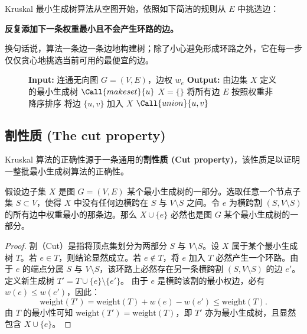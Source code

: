 Kruskal 最小生成树算法从空图开始，依照如下简洁的规则从 $E$ 中挑选边：
\begin{center}
    \textbf{反复添加下一条权重最小且不会产生环路的边。}
\end{center}

换句话说，算法一条边一条边地构建树；除了小心避免形成环路之外，它在每一步仅仅贪心地挑选当前可用的最便宜的边。

\begin{figure}[htbp]
\centering
\begin{tcolorbox}[colback=white,colframe=gray!50!black,title={\textbf{图 5.4}\quad Kruskal 最小生成树算法}]
\begin{algorithmic}[1]
    \State \textbf{Input:} 连通无向图 $G = (V, E)$，边权 $w_e$
    \State \textbf{Output:} 由边集 $X$ 定义的最小生成树
        \State $\Call{makeset}{u}$
    \EndFor
    \State $X = \{\}$
    \State 将所有边 $E$ 按照权重非降序排序
            \State 将边 $\{u, v\}$ 加入 $X$
            \State $\Call{union}{u, v}$
        \EndIf
    \EndFor
\EndProcedure
\end{algorithmic}
\end{tcolorbox}
\label{fig:kruskal_alg}
\end{figure}

\subsection{割性质 (The cut property)}

Kruskal 算法的正确性源于一条通用的\textbf{割性质 (Cut property)}，该性质足以证明一整批最小生成树算法的正确性。

\begin{lemma}
假设边子集 $X$ 是图 $G = (V, E)$ 某个最小生成树的一部分。选取任意一个节点子集 $S \subset V$，使得 $X$ 中没有任何边横跨在 $S$ 与 $V \setminus S$ 之间。令 $e$ 为横跨割 $(S, V \setminus S)$ 的所有边中权重最小的那条边。那么 $X \cup \{e\}$ 必然也是图 $G$ 某个最小生成树的一部分。
\end{lemma}

\begin{proof}
割（Cut）是指将顶点集划分为两部分 $S$ 与 $V \setminus S$。设 $X$ 属于某个最小生成树 $T$。若 $e \in T$，则结论显然成立。若 $e \notin T$，将 $e$ 加入 $T$ 必然产生一个环路。由于 $e$ 的端点分属 $S$ 与 $V \setminus S$，该环路上必然存在另一条横跨割 $(S, V \setminus S)$ 的边 $e'$。定义新生成树 $T' = T \cup \{e\} \setminus \{e'\}$。
由于 $e$ 是横跨该割的最小权边，必有 $w(e) \le w(e')$，因此：
\[
\text{weight}(T') = \text{weight}(T) + w(e) - w(e') \le \text{weight}(T).
\]
由 $T$ 的最小性可知 $\text{weight}(T') = \text{weight}(T)$，即 $T'$ 亦为最小生成树，且显然包含 $X \cup \{e\}$。
\end{proof}

